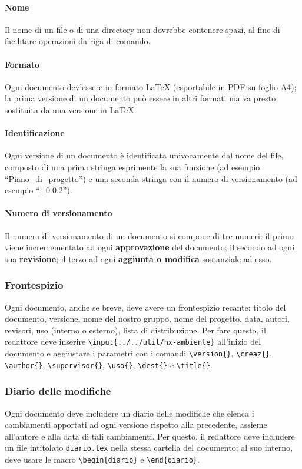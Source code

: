 \paragraph{Nome} Il nome di un file o di una directory non dovrebbe contenere spazi, al fine di facilitare operazioni da riga di comando.
\paragraph{Formato} Ogni documento dev'essere in formato \LaTeX{} (esportabile in PDF su foglio A4); la prima versione di un documento può essere in altri formati ma va presto sostituita da una versione in \LaTeX.
\paragraph{Identificazione} Ogni versione di un documento è identificata univocamente dal nome del file, composto di una prima stringa esprimente la sua funzione (ad esempio “Piano\_di\_progetto”) e una seconda stringa con il numero di versionamento (ad esempio “\_0.0.2”).
\paragraph{Numero di versionamento} Il numero di versionamento di un documento si compone di tre numeri: il primo viene incremementato ad ogni \textbf{approvazione} del documento; il secondo ad ogni sua \textbf{revisione}; il terzo ad ogni \textbf{aggiunta o modifica} sostanziale ad esso.

\subsubsection{Frontespizio} Ogni documento, anche se breve, deve avere un frontespizio recante: titolo del documento, versione, nome del nostro gruppo, nome del progetto, data, autori, revisori, uso (interno o esterno), lista di distribuzione. Per fare questo, il redattore deve inserire \texttt{\textbackslash input\{../../util/hx-ambiente\}} all'inizio del documento e aggiustare i parametri con i comandi \texttt{\textbackslash version\{\}}, \texttt{\textbackslash creaz\{\}}, \texttt{\textbackslash author\{\}}, \texttt{\textbackslash supervisor\{\}}, \texttt{\textbackslash uso\{\}}, \texttt{\textbackslash dest\{\}} e \texttt{\textbackslash title\{\}}.

\subsubsection{Diario delle modifiche} Ogni documento deve includere un diario delle modifiche che elenca i cambiamenti apportati ad ogni versione rispetto alla precedente, assieme all'autore e alla data di tali cambiamenti. Per questo, il redattore deve includere un file intitolato \texttt{diario.tex} nella stessa cartella del documento; al suo interno, deve usare le macro \texttt{\textbackslash begin\{diario\}} e \texttt{\textbackslash end\{diario\}}.

